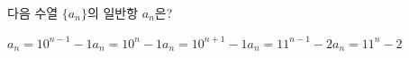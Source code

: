 다음 수열 $\{a_n\}$의 일반항 $a_n$은?
\begin{choicesii}{$a_n=10^{n-1}-1$}{$a_n=10^{n}-1$}{$a_n=10^{n+1}-1$}{$a_n=11^{n-1}-2$}{$a_n=11^{n}-2$}\end{choicesii}
